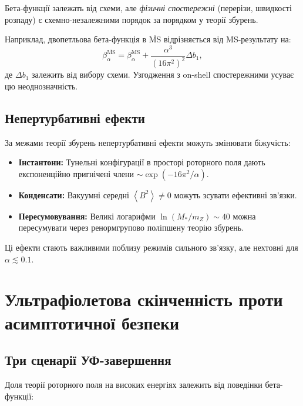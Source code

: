 \documentclass[11pt,a4paper]{article}
\numberwithin{equation}{section}
\theoremstyle{plain}
\theoremstyle{definition}
\theoremstyle{remark}
\newcommand{\avg}[1]{\left\langle #1 \right\rangle}
\begin{document}
Бета-функції залежать від схеми, але \emph{фізичні спостережні} (перерізи, швидкості розпаду) є схемно-незалежними порядок за порядком у теорії збурень.

Наприклад, двопетльова бета-функція в $\overline{\text{MS}}$ відрізняється від MS-результату на:
\begin{equation}
\beta_\alpha^{\overline{\text{MS}}} = \beta_\alpha^{\text{MS}} + \frac{\alpha^3}{(16\pi^2)^2}\Delta b_1,
\label{eq:beta-scheme}
\end{equation}
де $\Delta b_1$ залежить від вибору схеми. Узгодження з on-shell спостережними усуває цю неоднозначність.

\subsection{Непертурбативні ефекти}

За межами теорії збурень непертурбативні ефекти можуть змінювати біжучість:
\begin{itemize}
  \item \textbf{Інстантони:} Тунельні конфігурації в просторі роторного поля дають експоненційно пригнічені члени $\sim \exp(-16\pi^2/\alpha)$.
  \item \textbf{Конденсати:} Вакуумні середні $\avg{B^2}\neq 0$ можуть зсувати ефективні зв'язки.
  \item \textbf{Пересумовування:} Великі логарифми $\ln(M_*/m_Z)\sim 40$ можна пересумувати через ренормгрупово поліпшену теорію збурень.
\end{itemize}

Ці ефекти стають важливими поблизу режимів сильного зв'язку, але нехтовні для $\alpha\lesssim 0{.}1$.

\vspace{1em}

\section{Ультрафіолетова скінченність проти асимптотичної безпеки}\label{sec:UV}

\subsection{Три сценарії УФ-завершення}

Доля теорії роторного поля на високих енергіях залежить від поведінки бета-функції:
\end{document}
